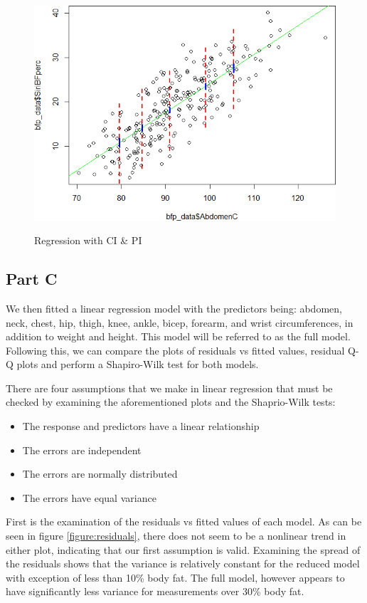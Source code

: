 \documentclass[a4paper, 11pt]{article}
\begin{document}
\begin{figure}[H]
	\centering
	\caption{Regression with CI \& PI}
	\includegraphics[width=\textwidth]{plot_with_intervals.png}
	\label{figure:ci_pi}
\end{figure}

\subsection*{Part C}

We then fitted a linear regression model with the predictors being: abdomen, neck, chest, hip, thigh, knee, ankle, bicep, forearm, and wrist circumferences, in addition to weight and height. This model will be referred to as the full model. Following this, we can compare the plots of residuals vs fitted values, residual Q-Q plots and perform a Shapiro-Wilk test for both models.

There are four assumptions that we make in linear regression that must be checked by examining the aforementioned plots and the Shaprio-Wilk tests:
\begin{itemize}
	\item The response and predictors have a linear relationship
	\item The errors are independent
	\item The errors are normally distributed
	\item The errors have equal variance
\end{itemize}

First is the examination of the residuals vs fitted values of each model. As can be seen in figure \ref{figure:residuals}, there does not seem to be a nonlinear trend in either plot, indicating that our first assumption is valid. Examining the spread of the residuals shows that the variance is relatively constant for the reduced model with exception of less than 10\% body fat. The full model, however appears to have significantly less variance for measurements over 30\% body fat. 
\end{document}
